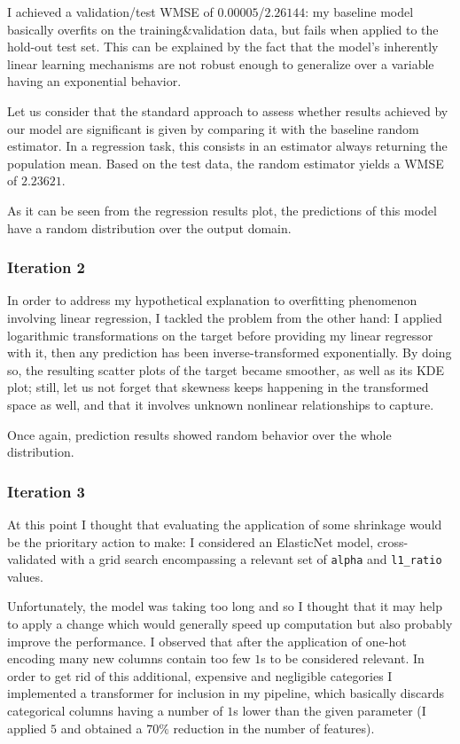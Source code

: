 \documentclass[preprint,12pt,3p]{elsarticle}
\begin{document}
I achieved a validation/test WMSE of $0.00005$/$2.26144$: my baseline model basically overfits on the training\&validation data, but fails when applied to the hold-out test set. This can be explained by the fact that the model's inherently linear learning mechanisms are not robust enough to generalize over a variable having an exponential behavior.

Let us consider that the standard approach to assess whether results achieved by our model are significant is given by comparing it with the baseline random estimator. In a regression task, this consists in an estimator always returning the population mean. Based on the test data, the random estimator yields a WMSE of $2.23621$.

As it can be seen from the regression results plot, the predictions of this model have a random distribution over the output domain.

\subsubsection{Iteration 2}
In order to address my hypothetical explanation to overfitting phenomenon involving linear regression, I tackled the problem from the other hand: I applied logarithmic transformations on the target before providing my linear regressor with it, then any prediction has been inverse-transformed exponentially. By doing so, the resulting scatter plots of the target became smoother, as well as its KDE plot; still, let us not forget that skewness keeps happening in the transformed space as well, and that it involves unknown nonlinear relationships to capture.

Once again, prediction results showed random behavior over the whole distribution.

\subsubsection{Iteration 3}
At this point I thought that evaluating the application of some shrinkage would be the prioritary action to make: I considered an ElasticNet model, cross-validated with a grid search encompassing a relevant set of \verb|alpha| and \verb|l1_ratio| values. 

Unfortunately, the model was taking too long and so I thought that it may help to apply a change which would generally speed up computation but also probably improve the performance. I observed that after the application of one-hot encoding many new columns contain too few $1$s to be considered relevant. In order to get rid of this additional, expensive and negligible categories I implemented a transformer for inclusion in my pipeline, which basically discards categorical columns having a number of $1$s lower than the given parameter (I applied $5$ and obtained a $70\%$ reduction in the number of features).
\end{document}
